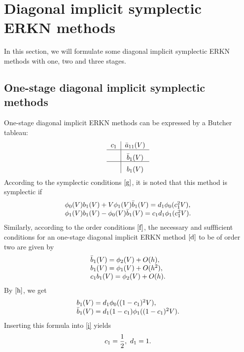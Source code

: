 \documentclass{article}
\begin{document}
\section{Diagonal implicit symplectic ERKN methods}\label{three}
In this section, we will formulate some diagonal implicit symplectic
ERKN methods with one, two and three stages.

\subsection{One-stage diagonal implicit symplectic methods}\label{ghhgg}
One-stage diagonal implicit ERKN methods can be expressed by a
Butcher tableau:
\[%
\begin{tabular}
[c]{c|ccc}%
$c_{1}$ & $\bar{a}_{11}(V)$ \\\hline &

$\raisebox{-1.3ex}[0.5pt]{$\bar{b}_1(V)$}$\\\hline &

$\raisebox{-1.3ex}[1.0pt]{$b_1(V)$}$%
\end{tabular}
\]
According to the symplectic conditions $\eqref{g}$, it is noted that
this method is symplectic if
\begin{equation}
\begin{array}
[c]{ll}%
\phi_{0}(V)b_{1}(V)+V\phi_{1}(V)\bar{b}_{1}(V)=d_{1}\phi_{0}(c_{1}^{2}V),\\
\phi_{1}(V)b_{1}(V)-\phi_{0}(V)\bar{b}_{1}(V)=c_{1}d_{1}\phi_{1}(c_{1}^{2}V).

\end{array}
  \label{h}%
\end{equation}
 Similarly, according to the order conditions $\eqref{f}$, the
necessary and suffficient conditions for an one-stage
 diagonal implicit ERKN method $\eqref{d}$ to be
of order two are given by
\begin{equation}
\begin{array}
[c]{ll}%
\bar{b}_{1}(V)=\phi_{2}(V)+O(h),\\
b_{1}(V)=\phi_{1}(V)+O(h^{2}),\\
c_{1}b_{1}(V)=\phi_{2}(V)+O(h).
\end{array}
  \label{i}%
\end{equation}
By $\eqref{h}$, we get
\begin{equation*}
\begin{array}
[c]{ll}%
b_{1}(V)=d_{1}\phi_{0}((1-c_{1})^{2}V ),\\
\bar{b}_{1}(V)=d_{1}(1-c_{1})\phi_{1}((1-c_{1})^{2}V).
\end{array}
\label{j}%
\end{equation*}
 Inserting this formula into \eqref{i} yields
\begin{equation*}
\begin{array}
[c]{ll}%
c_{1}=\dfrac{1}{2},\ d_{1}=1.
\end{array}
\label{n}%
\end{equation*}
\end{document}
